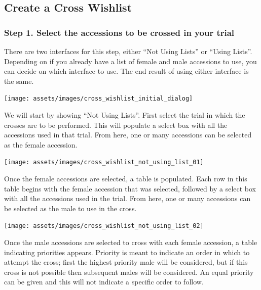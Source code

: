 \documentclass[
  12pt,
]{book}
\begin{document}
\hypertarget{create-a-cross-wishlist}{%
\subsection{Create a Cross Wishlist}\label{create-a-cross-wishlist}}

\hypertarget{step-1.-select-the-accessions-to-be-crossed-in-your-trial}{%
\subsubsection*{Step 1. Select the accessions to be crossed in your trial}\label{step-1.-select-the-accessions-to-be-crossed-in-your-trial}}


There are two interfaces for this step, either ``Not Using Lists'' or ``Using Lists''. Depending on if you already have a list of female and male accessions to use, you can decide on which interface to use. The end result of using either interface is the same.

\begin{center}\texttt{[image: assets/images/cross\_wishlist\_initial\_dialog]} \end{center}

We will start by showing ``Not Using Lists''. First select the trial in which the crosses are to be performed. This will populate a select box with all the accessions used in that trial. From here, one or many accessions can be selected as the female accession.

\begin{center}\texttt{[image: assets/images/cross\_wishlist\_not\_using\_list\_01]} \end{center}

Once the female accessions are selected, a table is populated. Each row in this table begins with the female accession that was selected, followed by a select box with all the accessions used in the trial. From here, one or many accessions can be selected as the male to use in the cross.

\begin{center}\texttt{[image: assets/images/cross\_wishlist\_not\_using\_list\_02]} \end{center}

Once the male accessions are selected to cross with each female accession, a table indicating priorities appears. Priority is meant to indicate an order in which to attempt the cross; first the highest priority male will be considered, but if this cross is not possible then subsequent males will be considered. An equal priority can be given and this will not indicate a specific order to follow.
\end{document}

